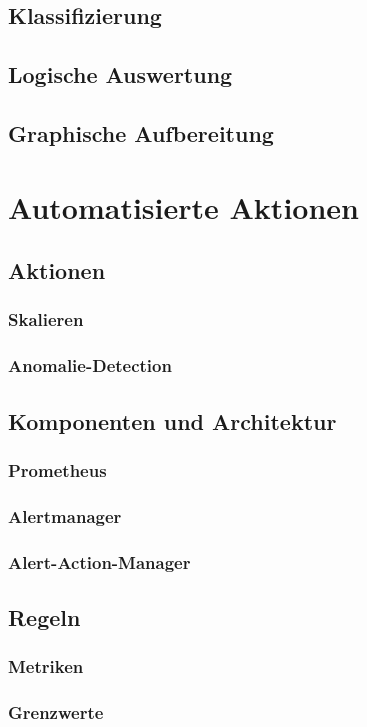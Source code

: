 \documentclass[a4paper,12pt]{scrartcl}
\begin{document}
\subsection{Klassifizierung}
\subsection{Logische Auswertung}
\subsection{Graphische Aufbereitung}

\section{Automatisierte Aktionen}
\subsection{Aktionen}
\subsubsection{Skalieren}
\subsubsection{Anomalie-Detection}
\subsection{Komponenten und Architektur}
\subsubsection{Prometheus}
\subsubsection{Alertmanager}
\subsubsection{Alert-Action-Manager}
\subsection{Regeln}
\subsubsection{Metriken}
\subsubsection{Grenzwerte}
\end{document}
